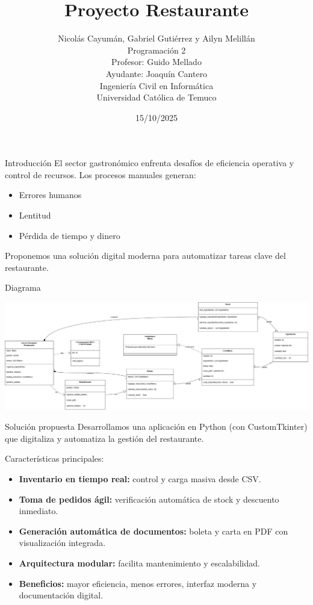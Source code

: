 \documentclass{beamer}
\title{Proyecto Restaurante}
\author{
Nicolás Cayumán, Gabriel Gutiérrez y Ailyn Melillán\\[4pt]
\small Programación 2\\
Profesor: Guido Mellado\\
Ayudante: Joaquín Cantero\\
Ingeniería Civil en Informática\\
Universidad Católica de Temuco
}
\date{15/10/2025}
\begin{document}
\begin{frame}
  \titlepage
\end{frame}

\begin{frame}{Introducción}
El sector gastronómico enfrenta desafíos de eficiencia operativa y control de recursos.
Los procesos manuales generan:
    \begin{itemize}
            \item Errores humanos
            \item Lentitud
            \item Pérdida de tiempo y dinero
    \end{itemize}
Proponemos una solución digital moderna para automatizar tareas clave del restaurante.
\end{frame}


\begin{frame}{Diagrama}
    \begin{center}
        \includegraphics[width=1\textwidth]{images/Diagramaproyecto.jpg}
    \end{center}
\end{frame}

\begin{frame}{Solución propuesta}
Desarrollamos una aplicación en Python (con CustomTkinter) que digitaliza y automatiza la gestión del restaurante.

Características principales:
\begin{itemize}
    
    \item \textbf{Inventario en tiempo real:} control y carga masiva desde CSV.
    \item \textbf{Toma de pedidos ágil:} verificación automática de stock y descuento inmediato.
    \item \textbf{Generación automática de documentos:} boleta y carta en PDF con visualización integrada.
    \item \textbf{Arquitectura modular:} facilita mantenimiento y escalabilidad.
    \item \textbf{Beneficios:} mayor eficiencia, menos errores, interfaz moderna y documentación digital.
\end{itemize}
\end{frame}
\end{document}
